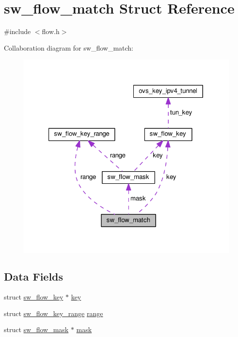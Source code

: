 \hypertarget{structsw__flow__match}{}\section{sw\+\_\+flow\+\_\+match Struct Reference}
\label{structsw__flow__match}


{\ttfamily \#include $<$flow.\+h$>$}



Collaboration diagram for sw\+\_\+flow\+\_\+match\+:
\nopagebreak
\begin{figure}[H]
\begin{center}
\leavevmode
\includegraphics[width=321pt]{structsw__flow__match__coll__graph}
\end{center}
\end{figure}
\subsection*{Data Fields}
\begin{DoxyCompactItemize}
\item 
struct \hyperlink{structsw__flow__key}{sw\+\_\+flow\+\_\+key} $\ast$ \hyperlink{structsw__flow__match_a4030aac38105b63798ea11f43f506372}{key}
\item 
struct \hyperlink{structsw__flow__key__range}{sw\+\_\+flow\+\_\+key\+\_\+range} \hyperlink{structsw__flow__match_aed5e18f9a96464cce4b4e4443d550b2d}{range}
\item 
struct \hyperlink{structsw__flow__mask}{sw\+\_\+flow\+\_\+mask} $\ast$ \hyperlink{structsw__flow__match_a4536aff731528d6def7d386435c203d1}{mask}
\end{DoxyCompactItemize}


